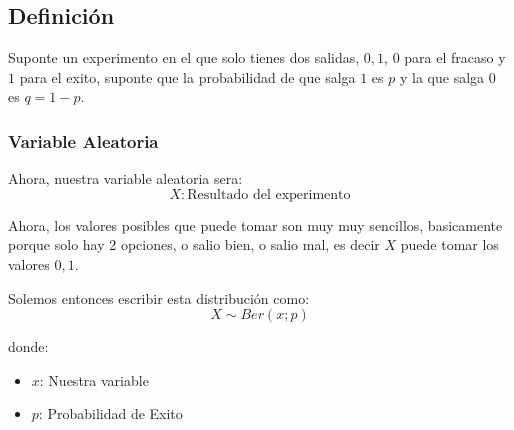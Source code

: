 \documentclass[12pt, fleqn]{report}                             %
\theoremstyle{break}                                            %
\begin{document}
            \subsection{Definición}

                Suponte un experimento en el que solo tienes dos salidas, 
                $0, 1$, $0$ para el fracaso y $1$ para el exito,
                suponte que la probabilidad de que salga $1$ es $p$
                y la que salga $0$ es $q = 1 - p$.


                \vspace{1em}
                \subsubsection{Variable Aleatoria}

                    Ahora, nuestra variable aleatoria sera:
                    \begin{equation*}
                        X : \text{Resultado del experimento}
                    \end{equation*}

                    Ahora, los valores posibles que puede tomar son muy muy sencillos, basicamente porque
                    solo hay 2 opciones, o salio bien, o salio mal, es decir $X$ puede tomar los valores
                    $0, 1$.

                    Solemos entonces escribir esta distribución como:
                    \begin{equation*}
                        X \sim Ber(x; p)
                    \end{equation*}

                    donde:
                    \begin{itemize}
                        \item $x$: Nuestra variable
                        \item $p$: Probabilidad de Exito
                    \end{itemize}



            \clearpage
\end{document}
